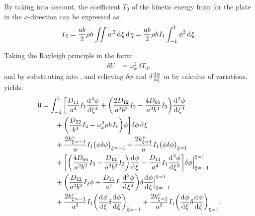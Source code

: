 \documentclass[preprint,12pt]{elsarticle}
\newcommand{\id}{\mathrm{d}\mkern1mu}
\begin{document}
By taking  into account, the coefficient $T_0$ of the kinetic energy from  for the plate in the $x$-direction can be expressed as:
%
\begin{equation}\label{eq:kine_energyx}
	\begin{split}
		T_0 = \frac{ab}{2}\rho h\iint w^2 \, \id \xi \, \id \eta = \frac{ab}{2}\rho h I_1\int_{-1}^{1} \phi^2 \, \id \xi.
	\end{split}
\end{equation}

Taking the Rayleigh principle in the form:
%
\begin{equation}\label{eq:Rayleighx}
	\begin{split}
		\delta U &= \omega_x^2 \, \delta T_0,
	\end{split}
\end{equation}
%
and by substituting  into , and relieving $\delta \phi$ and $\delta\frac{\id  \phi}{\id \xi}$ in  by calculus of variations, yields:
%
\begin{equation}\label{eq:Rayleighx2}
	\begin{split}
		0 &= \int_{-1}^{1} \bigg[ \frac{D_{11}}{a^4} I_1 \frac{\id^4 \phi}{\id \xi^4} 
		+ \bigg( \frac{2D_{12}}{a^2b^2} I_2 - \frac{4D_{66}}{a^2b^2} I_3 \bigg) \frac{\id^2 \phi}{\id \xi^2} \\
		&\qquad + \bigg( \frac{D_{22}}{b^4} I_4 - \omega_x^2 \rho h I_1 \bigg) \phi \bigg] \delta \phi \, \id \xi \\
		&\qquad + \frac{2k^v_{\xi=-1}}{a} I_1 \big(\phi \delta \phi\big)_{\xi=-1} 
		+ \frac{2k^v_{\xi=1}}{a} I_1 \big(\phi \delta \phi\big)_{\xi=1} \\
		&\qquad + \bigg[ \bigg( \frac{4D_{66}}{a^2b^2} I_3 - \frac{D_{12}}{a^2b^2} I_2 \bigg) \frac{\id \phi}{\id \xi} 
		- \frac{D_{11}}{a^4} I_1 \frac{\id^3 \phi}{\id \xi^3} \bigg] \delta \phi \Big|^{\xi=1}_{\xi=-1} \\
		&\qquad + \bigg( \frac{D_{12}}{a^2b^2} I_2 \phi + \frac{D_{11}}{a^4} I_1 \frac{\id^2 \phi}{\id \xi^2} \bigg) 
		\delta\frac{\id  \phi}{\id \xi} \Big|^{\xi=1}_{\xi=-1} \\
		&\qquad + \frac{2k^r_{\xi=-1}}{a^3} I_1 \bigg(\frac{\id \phi}{\id \xi}\delta \frac{\id \phi}{\id \xi}\bigg)_{\xi=-1} 
		+ \frac{2k^r_{\xi=1}}{a^3} I_1 \bigg(\frac{\id \phi}{\id \xi} \delta\frac{\id \phi}{\id \xi}\bigg)_{\xi=1}.
	\end{split}
\end{equation}
\end{document}

